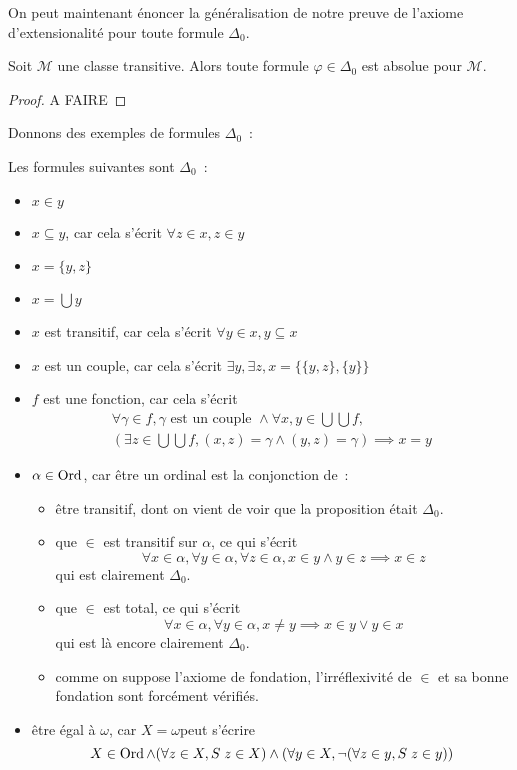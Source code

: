 On peut maintenant énoncer la généralisation de notre preuve de l'axiome
d'extensionalité pour toute formule $\Delta_0$.

\begin{proposition}
  Soit $\mathcal M$ une classe transitive. Alors toute formule
  $\varphi\in\Delta_0$ est absolue pour $\mathcal M$.
\end{proposition}

\begin{proof}
  A FAIRE
\end{proof}

Donnons des exemples de formules $\Delta_0$~:

\begin{example}
  Les formules suivantes sont $\Delta_0$~:
  \begin{itemize}
  \item $x\in y$
  \item $x\subseteq y$, car cela s'écrit $\forall z \in x, z \in y$
  \item $x = \{y,z\}$
  \item $x = \bigcup y$
  \item $x$ est transitif, car cela s'écrit $\forall y \in x, y\subseteq x$
  \item $x$ est un couple, car cela s'écrit
    $\exists y,\exists z, x = \{\{y,z\},\{y\}\}$
  \item $f$ est une fonction, car cela s'écrit
    \begin{multline*}
      \forall \gamma \in f, \gamma\text{ est un couple }\land
      \forall x,y \in \bigcup \bigcup f,\\
      (\exists z \in \bigcup\bigcup f,
      (x,z) = \gamma \land (y,z) = \gamma) \implies x = y
    \end{multline*}
  \item $\alpha \in \operatorname{Ord}$, car être un ordinal est la conjonction de~:
    \begin{itemize}
    \item être transitif, dont on vient de voir que la proposition était
      $\Delta_0$.
    \item que $\in$ est transitif sur $\alpha$, ce qui s'écrit
      \[\forall x \in \alpha, \forall y \in \alpha, \forall z \in \alpha,
      x\in y \land y \in z \implies x \in z\] qui est clairement $\Delta_0$.
    \item que $\in$ est total, ce qui s'écrit
      \[\forall x \in \alpha, \forall y \in \alpha, x \neq y \implies
      x \in y \lor y \in x\] qui est là encore clairement $\Delta_0$.
    \item comme on suppose l'axiome de fondation, l'irréflexivité de $\in$ et sa
      bonne fondation sont forcément vérifiés.
    \end{itemize}
  \item être égal à $\omega$, car \og $X = \omega$\fg peut s'écrire
    \[X\in \operatorname{Ord} \land (\forall z \in X, S\;z \in X) \land
    (\forall y \in X, \lnot (\forall z \in y, S\;z \in y))\]
  \end{itemize}
\end{example}

